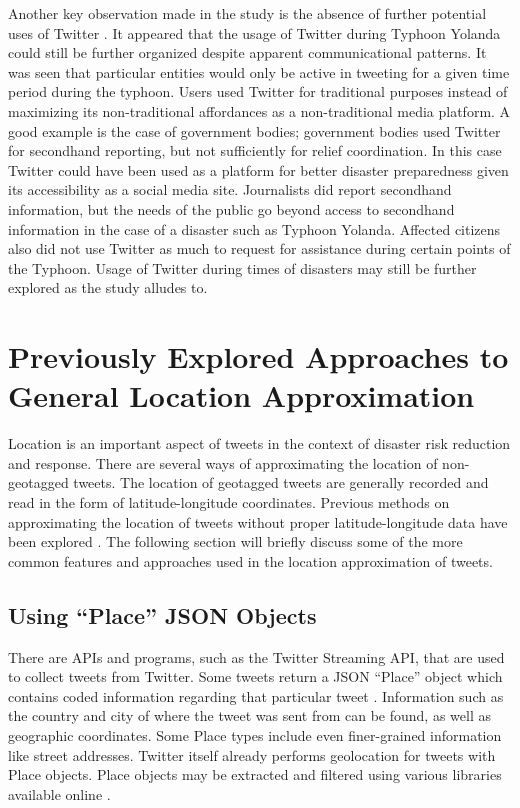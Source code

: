 Another key observation made in the study is the absence of further potential uses of Twitter \cite{TTC2015}. It appeared that the usage of Twitter during Typhoon Yolanda could still be further organized despite apparent communicational patterns. It was seen that particular entities would only be active in tweeting for a given time period during the typhoon. Users used Twitter for traditional purposes instead of maximizing its non-traditional affordances as a non-traditional media platform. A good example is the case of government bodies; government bodies used Twitter for secondhand reporting, but not sufficiently for relief coordination. In this case Twitter could have been used as a platform for better disaster preparedness given its accessibility as a social media site. Journalists did report secondhand information, but the needs of the public go beyond access to secondhand information in the case of a disaster such as Typhoon Yolanda. Affected citizens also did not use Twitter as much to request for assistance during certain points of the Typhoon. Usage of Twitter during times of disasters may still be further explored as the study alludes to.

\section{Previously Explored Approaches to General Location Approximation }
Location is an important aspect of tweets in the context of disaster risk reduction and response. There are several ways of approximating the location of non-geotagged tweets. The location of geotagged tweets are generally recorded and read in the form of latitude-longitude coordinates. Previous methods on approximating the location of tweets without proper latitude-longitude data have been explored \cite{carmen, GFC2012, OBCS2013,ROSALES2017,VELASCOBERMEJODOMINGO2018}. The following section will briefly discuss some of the more common features and approaches used in the location approximation of tweets. 

\subsection{Using ``Place'' JSON Objects}
There are APIs and programs, such as the Twitter Streaming API, that are used to collect tweets from Twitter. Some tweets return a JSON “Place” object which contains coded information regarding that particular tweet \cite{OBCS2013, GFC2012, carmen}. Information such as the country and city of where the tweet was sent from can be found, as well as geographic coordinates. Some Place types include even finer-grained information like street addresses. Twitter itself already performs geolocation for tweets with Place objects. Place objects may be extracted and filtered using various libraries available online \cite{tweepy}.

